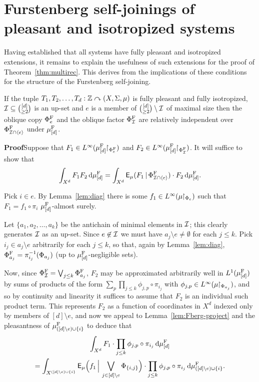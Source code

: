\documentclass[12pt]{article}
\begin{document}
\section{Furstenberg self-joinings of pleasant and isotropized systems}

Having established that all systems have fully pleasant and
isotropized extensions, it remains to explain the usefulness of such
extensions for the proof of Theorem~\ref{thm:multirec}.  This
derives from the implications of these conditions for the structure
of the Furstenberg self-joining.

\begin{lem}\label{lem:Fberg-struct}
If the tuple $T_1,T_2,\ldots,T_d:\bbZ\curvearrowright(X,\S,\mu)$ is
fully pleasant and fully isotropized,
$\cal{I}\subseteq\binom{[d]}{\geq 2}$ is an up-set and $e$ is a
member of $\binom{[d]}{\geq 2}\setminus\cal{I}$ of maximal size then
the oblique copy $\Phi^{\rm{F}}_e$ and the oblique factor
$\Phi^{\rm{F}}_{\cal{I}}$ are relatively independent over
$\Phi^{\rm{F}}_{\cal{I}\cap\langle e\rangle}$ under
$\mu^{\rm{F}}_{[d]}$.
\end{lem}

\textbf{Proof}\quad Suppose that $F_1 \in
L^\infty(\mu^{\rm{F}}_{[d]}\uhr_{\Phi^{\rm{F}}_e})$ and $F_2 \in
L^\infty(\mu^{\rm{F}}_{[d]}\uhr_{\Phi^{\rm{F}}_{\cal{I}}})$. It will
suffice to show that
\[\int_{X^d}F_1F_2\,\d\mu^{\rm{F}}_{[d]} = \int_{X^d}\sfE_\mu(F_1\,|\,\Phi^{\rm{F}}_{\cal{I}\cap\langle
e\rangle})\cdot F_2\,\d\mu^{\rm{F}}_{[d]}.\]

Pick $i\in e$. By Lemma~\ref{lem:diag} there is some $f_1 \in
L^\infty(\mu\uhr_{\Phi_e})$ such that $F_1 = f_1\circ\pi_i$
$\mu^{\rm{F}}_{[d]}$-almost surely.

Let $\{a_1,a_2,\ldots,a_k\}$ be the antichain of minimal elements in
$\cal{I}$; this clearly generates $\cal{I}$ as an up-set. Since $e
\not\in\cal{I}$ we must have $a_j \setminus e\not=\emptyset$ for
each $j \leq k$. Pick $i_j \in a_j\setminus e$ arbitrarily for each
$j\leq k$, so that, again by Lemma~\ref{lem:diag},
$\Phi^{\rm{F}}_{a_j} = \pi_{i_j}^{-1}(\Phi_{a_j})$ (up to
$\mu^{\rm{F}}_{[d]}$-negligible sets).

Now, since $\Phi^{\rm{F}}_{\cal{I}} = \bigvee_{j\leq
k}\Phi^{\rm{F}}_{a_j}$, $F_2$ may be approximated arbitrarily well
in $L^1(\mu^{\rm{F}}_{[d]})$ by sums of products of the form
$\sum_p\prod_{j\leq k}\phi_{j,p}\circ\pi_{i_j}$ with $\phi_{j,p}\in
L^\infty(\mu\uhr_{\Phi_{a_j}})$, and so by continuity and linearity
it suffices to assume that $F_2$ is an individual such product term.
This represents $F_2$ as a function of coordinates in $X^d$ indexed
only by members of $[d]\setminus e$, and now we appeal to
Lemma~\ref{lem:Fberg-project} and the pleasantness of
$\mu^{\rm{F}}_{([d]\setminus e)\cup\{i\}}$ to deduce that
\begin{multline*}
\int_{X^d}F_1\cdot \prod_{j\leq
k}\phi_{j,p}\circ\pi_{i_j}\,\d\mu^{\rm{F}}_{[d]}\\ =
\int_{X^{([d]\setminus
e)\cup\{i\}}}\sfE_\mu\Big(f_1\,\Big|\,\bigvee_{j\in[d]\setminus
e}\Phi_{\{i,j\}}\Big)\cdot \prod_{j\leq
k}\phi_{j,p}\circ\pi_{i_j}\,\d\mu^{\rm{F}}_{([d]\setminus
e)\cup\{i\}}.
\end{multline*}
\end{document}
